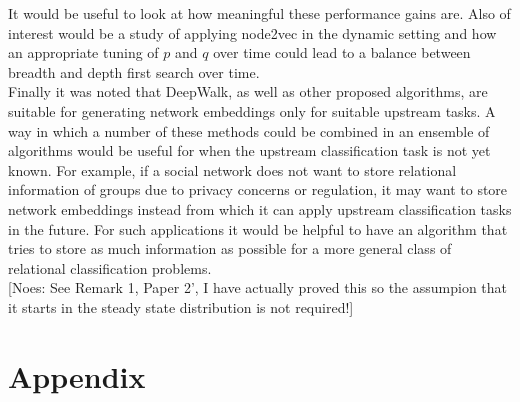 \documentclass[a4paper]{article}
\begin{document}
It would be useful to look at how meaningful these performance gains are. Also of interest would be a study of applying node2vec in the dynamic setting and how an appropriate tuning of $p$ and $q$ over time could lead to a balance between breadth and depth first search over time.\\
Finally it was noted that DeepWalk, as well as other proposed algorithms, are suitable for generating network embeddings only for suitable upstream tasks. A way in which a number of these methods could be combined in an ensemble of algorithms would be useful for when the upstream classification task is not yet known. For example, if a social network
does not want to store relational information of groups due to privacy concerns or regulation, it may want to store network embeddings instead from which it can apply upstream classification tasks in the future. For such applications it would be helpful to have an algorithm that tries to store as much information as possible for a more general class of relational classification problems.\\

[Noes: See Remark 1, Paper 2', I have actually proved this so the assumpion that it starts in the steady state distribution is not required!]
\section{Appendix}
\label{sec:appendix}
\end{document}

